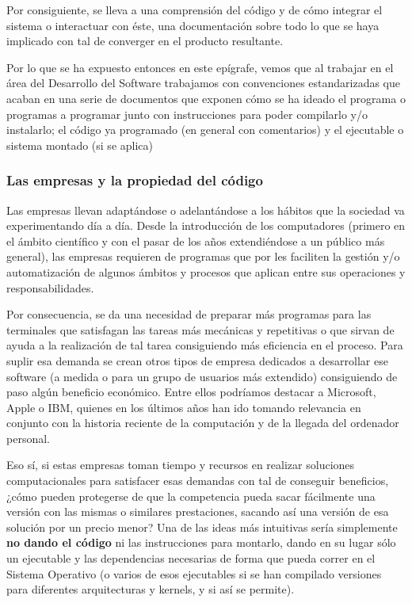 Por consiguiente, se lleva a una comprensión del código y de cómo integrar el sistema o interactuar con éste, una documentación sobre todo lo que se haya implicado con tal de converger en el producto resultante.

Por lo que se ha expuesto entonces en este epígrafe, vemos que al trabajar en el área del Desarrollo del Software trabajamos con convenciones estandarizadas que acaban en una serie de documentos que exponen cómo se ha ideado el programa o programas a programar junto con instrucciones para poder compilarlo y/o instalarlo; el código ya programado (en general con comentarios) y el ejecutable o sistema montado (si se aplica)

\subsubsection{Las empresas y la propiedad del código}
Las empresas llevan adaptándose o adelantándose a los hábitos que la sociedad va experimentando día a día.
Desde la introducción de los computadores (primero en el ámbito científico y con el pasar de los años extendiéndose a un público más general), las empresas requieren de programas que por les faciliten la gestión y/o automatización de algunos ámbitos y procesos que aplican entre sus operaciones y responsabilidades.

Por consecuencia, se da una necesidad de preparar más programas para las terminales que satisfagan las tareas más mecánicas y repetitivas o que sirvan de ayuda a la realización de tal tarea consiguiendo más eficiencia en el proceso. Para suplir esa demanda se crean otros tipos de empresa dedicados a desarrollar ese software (a medida o para un grupo de usuarios más extendido) consiguiendo de paso algún beneficio económico. Entre ellos podríamos destacar a Microsoft, Apple o IBM, quienes en los últimos años han ido tomando relevancia en conjunto con la historia reciente de la computación y de la llegada del ordenador personal.

Eso sí, si estas empresas toman tiempo y recursos en realizar soluciones computacionales para satisfacer esas demandas con tal de conseguir beneficios, ¿cómo pueden protegerse de que la competencia pueda sacar fácilmente una versión con las mismas o similares prestaciones, sacando así una versión de esa solución por un precio menor? Una de las ideas más intuitivas sería simplemente \textbf{no dando el código} ni las instrucciones para montarlo, dando en su lugar sólo un ejecutable y las dependencias necesarias de forma que pueda correr en el Sistema Operativo (o varios de esos ejecutables si se han compilado versiones para diferentes arquitecturas y kernels, y si así se permite). 

